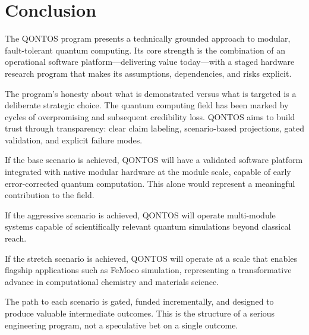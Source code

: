\documentclass[conference]{IEEEtran}
\begin{document}
\section{Conclusion}

The QONTOS program presents a technically grounded approach to modular, fault-tolerant quantum computing. Its core strength is the combination of an operational software platform---delivering value today---with a staged hardware research program that makes its assumptions, dependencies, and risks explicit.

The program's honesty about what is demonstrated versus what is targeted is a deliberate strategic choice. The quantum computing field has been marked by cycles of overpromising and subsequent credibility loss. QONTOS aims to build trust through transparency: clear claim labeling, scenario-based projections, gated validation, and explicit failure modes.

If the base scenario is achieved, QONTOS will have a validated software platform integrated with native modular hardware at the module scale, capable of early error-corrected quantum computation. This alone would represent a meaningful contribution to the field.

If the aggressive scenario is achieved, QONTOS will operate multi-module systems capable of scientifically relevant quantum simulations beyond classical reach.

If the stretch scenario is achieved, QONTOS will operate at a scale that enables flagship applications such as FeMoco simulation, representing a transformative advance in computational chemistry and materials science.

The path to each scenario is gated, funded incrementally, and designed to produce valuable intermediate outcomes. This is the structure of a serious engineering program, not a speculative bet on a single outcome.
\end{document}
